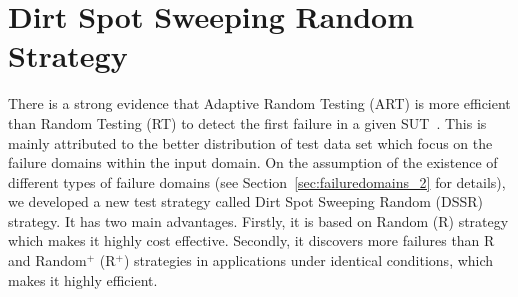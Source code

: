 
\chapter{Dirt Spot Sweeping Random Strategy}
\label{chap:DSSR}








There is a strong evidence that Adaptive Random Testing (ART) is more efficient than Random Testing (RT) to detect the first failure in a given SUT~\cite{chen2005adaptive}. This is mainly attributed to the better distribution of test data set which focus on the failure domains within the input domain. On the assumption of the existence of different types of failure domains (see Section~\ref{sec:failuredomains_2} for details), we developed a new test strategy called Dirt Spot Sweeping Random (DSSR) strategy. It has two main advantages. Firstly, it is based on Random (R) strategy which makes it highly cost effective. Secondly, it discovers more failures than R and Random$^+$ (R$^+$) strategies in applications under identical conditions, which makes it highly efficient.  

